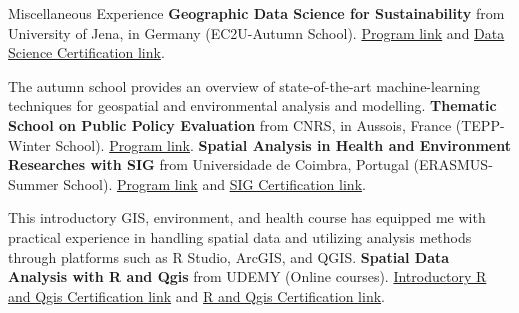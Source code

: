 \begin{rubric}{\small Miscellaneous Experience}
\entry*[October 2023] \textbf{Geographic Data Science for Sustainability} from University of Jena, in Germany (EC2U-Autumn School). \href{https://www.geographie.uni-jena.de/en/chairs/giscience/ec2u-autumn-school}{Program link} and 
\href{https://drive.google.com/file/d/14jppFSYrcp6uCCcPtrAc5UK4W5h0w5iN/view?usp=sharing}{Data Science Certification link}. \par
The autumn school provides an overview of state-of-the-art machine-learning techniques for geospatial and environmental analysis and modelling.
\entry*[March 2023] \textbf{Thematic School on Public Policy Evaluation} from CNRS, in Aussois, France (TEPP-Winter School). \href{https://sites.google.com/view/ecole-cnrs-tepp/pr%C3%A9sentation}{Program link}.
\entry*[July 2022] \textbf{Spatial Analysis in Health and Environment Researches with SIG} from Universidade de Coimbra, Portugal (ERASMUS-Summer School). \href{https://upmail.univ-poitiers.fr/service/home/~/?auth=co&loc=fr_FR&id=1326&part=2}{Program link} and
\href{https://drive.google.com/file/d/1CwFYKX4N2DJlZFNnQpOlwed1dW8QYxHe/view?usp=sharing}{SIG Certification link}.\par
This introductory GIS, environment, and health course has equipped me with practical experience in handling spatial data and utilizing analysis methods through platforms such as R Studio, ArcGIS, and QGIS. 
\entry*[2022] \textbf{Spatial Data Analysis with R and Qgis} from UDEMY (Online courses).
\href{https://drive.google.com/file/d/1jouJ8RtrbtKK8RCmgRU9tMoMtqbsSMVE/view?usp=sharing}{Introductory R and Qgis Certification link} and \href{https://drive.google.com/file/d/1hkekFJ80Vczpst5aba-Uc8l6PtVzj3DD/view?usp=sharing}{R and Qgis Certification link}.
\end{rubric}
